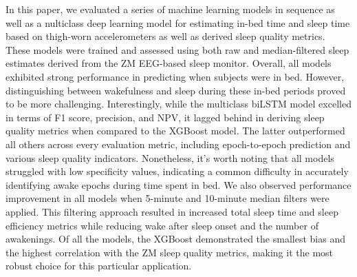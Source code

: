 \documentclass[
  10pt,
]{scrbook}
\begin{document}
In this paper, we evaluated a series of machine learning models in
sequence as well as a nulticlass deep learning model for estimating
in-bed time and sleep time based on thigh-worn accelerometers as well as
derived sleep quality metrics. These models were trained and assessed
using both raw and median-filtered sleep estimates derived from the ZM
EEG-based sleep monitor. Overall, all models exhibited strong
performance in predicting when subjects were in bed. However,
distinguishing between wakefulness and sleep during these in-bed periods
proved to be more challenging. Interestingly, while the multiclass
biLSTM model excelled in terms of F1 score, precision, and NPV, it
lagged behind in deriving sleep quality metrics when compared to the
XGBoost model. The latter outperformed all others across every
evaluation metric, including epoch-to-epoch prediction and various sleep
quality indicators. Nonetheless, it's worth noting that all models
struggled with low specificity values, indicating a common difficulty in
accurately identifying awake epochs during time spent in bed. We also
observed performance improvement in all models when 5-minute and
10-minute median filters were applied. This filtering approach resulted
in increased total sleep time and sleep efficiency metrics while
reducing wake after sleep onset and the number of awakenings. Of all the
models, the XGBoost demonstrated the smallest bias and the highest
correlation with the ZM sleep quality metrics, making it the most robust
choice for this particular application.
\end{document}
